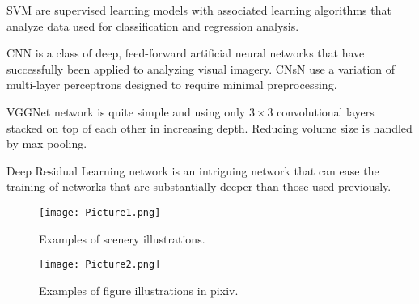 \documentclass[11pt]{article}
\begin{document}
SVM are supervised learning models with associated learning algorithms that analyze data used for classification and regression analysis. 

CNN is a class of deep, feed-forward artificial neural networks that have successfully been applied to analyzing visual imagery. CNsN use a variation of multi-layer perceptrons designed to require minimal preprocessing.

VGGNet network is quite simple and using only $3\times 3$ convolutional layers stacked on top of each other in increasing depth. Reducing volume size is handled by max pooling. 

Deep Residual Learning network is an intriguing network that can ease the training of networks that are substantially deeper than those used
previously.

\begin{figure}
  \centering
  \texttt{[image: Picture1.png]}
  \caption{Examples of scenery illustrations.}
  \label{words segmentation1}
\end{figure}

\begin{figure}
  \centering
  \texttt{[image: Picture2.png]}
  \caption{Examples of figure illustrations in pixiv.}
  \label{words segmentation1}
\end{figure}

%
%
\end{document}
